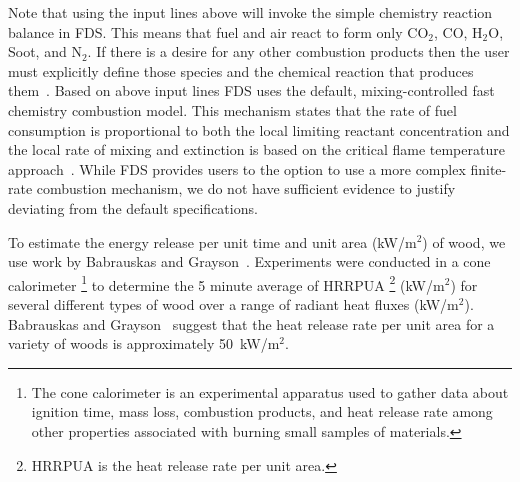 \documentclass[11pt,oneside]{book}
\begin{document}
Note that using the input lines above will invoke the simple chemistry reaction balance in FDS. This means that fuel and air react to form only CO$_2$, CO, H$_2$O, Soot, and N$_2$. If there is a desire for any other combustion products then the user must explicitly define those species and the chemical reaction that produces them~\cite{FDS_Users_Guide}. Based on above input lines FDS uses the default, mixing-controlled fast chemistry combustion model. This mechanism  states that the rate of fuel consumption is proportional to both the local limiting reactant concentration and the local rate of mixing and extinction is based on the critical flame temperature approach~\cite{FDS_Math_Guide}. While FDS provides users to the option to use a more complex finite-rate combustion mechanism, we do not have sufficient evidence to justify deviating from the default specifications. 

To estimate the energy release per unit time and unit area (kW/m$^2$) of wood, we use work by Babrauskas and Grayson~\cite{babrauskas1990}. Experiments were conducted in a cone calorimeter \footnote{The cone calorimeter is an experimental apparatus used to gather data about ignition time, mass loss, combustion products, and heat release rate among other properties associated with burning small samples of materials.} to determine the 5 minute average of HRRPUA  \footnote{HRRPUA is the heat release rate per unit area.} (kW/m$^2$) for several different types of wood over a range of radiant heat fluxes (kW/m$^2$). Babrauskas and Grayson~\cite{babrauskas1990} suggest that the heat release rate per unit area for a variety of woods is approximately 50~kW/m$^2$.
\end{document}
